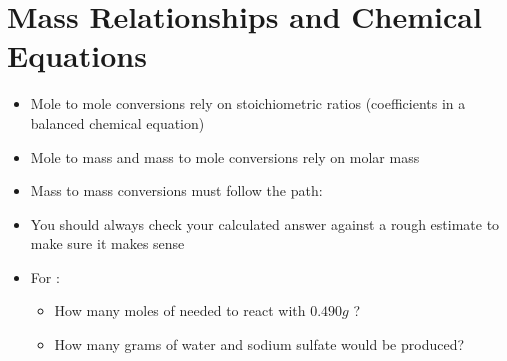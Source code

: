 \documentclass[12pt, openany, letterpaper]{memoir}
\begin{document}
\section{Mass Relationships and Chemical Equations}
\begin{itemize}
	\item Mole to mole conversions rely on stoichiometric ratios (coefficients in a balanced chemical equation)
	\item Mole to mass and mass to mole conversions rely on molar mass
	\item Mass to mass conversions must follow the path: 
	\item You should always check your calculated answer against a rough estimate to make sure it makes sense
	\item For :
	      \begin{itemize}
		      \item How many  moles of  needed to react with $0.490g$ ?
		      \item How many grams of water and sodium sulfate would be produced?
	      \end{itemize}
\end{itemize}
\end{document}
